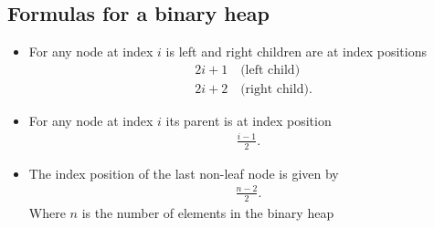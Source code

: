 \documentclass{report}
\begin{document}
    \subsection{Formulas for a binary heap}
    \begin{itemize}
        \item For any node at index $i$ is left and right children are at index positions
            \begin{align*}
                &2i + 1 \quad \text{(left child)} \\
                &2i+2 \quad \text{(right child)}
            .\end{align*}
        \item For any node at index $i$ its parent is at index position
            \begin{align*}
                \frac{i-1}{2}
            .\end{align*}
        \item The index position of the last non-leaf node is given by 
            \begin{align*}
                \frac{n-2}{2}
            .\end{align*}
            Where $n$ is the number of elements in the binary heap
    \end{itemize}

    \pagebreak 
\end{document}
